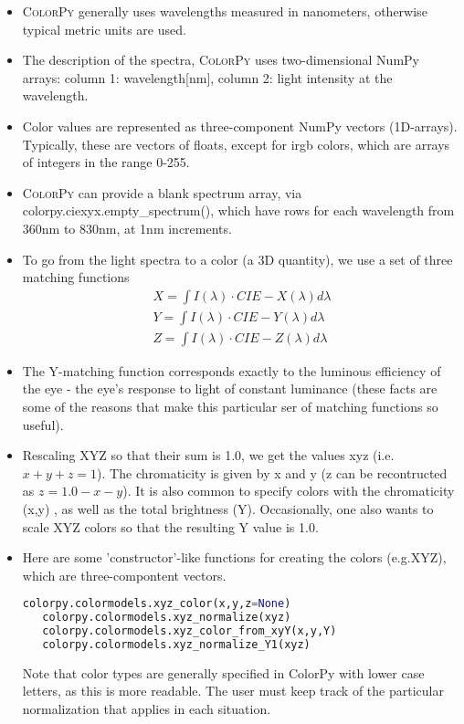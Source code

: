 \begin{itemize}
   \item \textsc{ColorPy} generally uses wavelengths measured in nanometers, otherwise typical metric
      units are used.
   \item The description of the spectra, \textsc{ColorPy} uses two-dimensional NumPy arrays:
      column 1: wavelength[nm], column 2: light intensity at the wavelength.
   \item Color values are represented as three-component NumPy vectors (1D-arrays). Typically, these are 
      vectors of floats, except for irgb colors, which are arrays of integers in the range 0-255.
   \item \textsc{ColorPy} can provide a blank spectrum array, via colorpy.ciexyx.empty\_spectrum(),
      which have rows for each wavelength from 360nm to 830nm, at 1nm increments.
   \item To go from the light spectra to a color (a 3D quantity), we use a set of three matching functions
      \begin{align}
         X = \int I(\lambda) \cdot C\!I\!E\!-\!\!X(\lambda) d\!\lambda\\
         Y = \int I(\lambda) \cdot C\!I\!E\!-\!\!Y(\lambda) d\!\lambda\\
         Z = \int I(\lambda) \cdot C\!I\!E\!-\!\!Z(\lambda) d\!\lambda
      \end{align}
   \item The Y-matching function corresponds exactly to the luminous efficiency of the eye - the eye's
      response to light of constant luminance (these facts are some of the reasons that make this 
      particular ser of matching functions so useful).
   \item Rescaling XYZ so that their sum is 1.0, we get the values xyz (i.e. $x + y + z = 1$).
      The chromaticity is given by x and y (z can be recontructed as $z = 1.0 - x - y$). 
      It is also common to specify colors with the chromaticity (x,y) , as well as the total
      brightness (Y). Occasionally, one also wants to scale XYZ colors so that the resulting Y value is 1.0.

   \item Here are some 'constructor'-like functions for creating the colors (e.g.XYZ), which are 
      three-compontent vectors.
\begin{lstlisting}[style=FormattedNumber, language=python, frame=none]
   colorpy.colormodels.xyz_color(x,y,z=None)
   colorpy.colormodels.xyz_normalize(xyz)
   colorpy.colormodels.xyz_color_from_xyY(x,y,Y)
   colorpy.colormodels.xyz_normalize_Y1(xyz)
\end{lstlisting}
   Note that color types are generally specified in ColorPy with lower case letters, as this is more 
   readable. The user must keep track of the particular normalization that applies in each situation.
\end{itemize}

